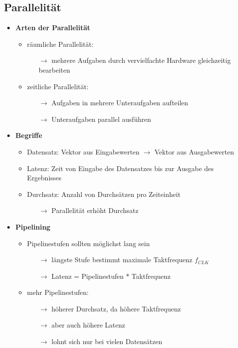 \documentclass[11pt,a4paper]{article}
\begin{document}
\subsection{Parallelität}
\begin{itemize}

\item \textbf{Arten der Parallelität}
	\begin{itemize}
	\item räumliche Parallelität:
		\begin{itemize}
		\item[$\rightarrow$] mehrere Aufgaben durch vervielfachte Hardware gleichzeitig bearbeiten
		\end{itemize}
	
	\item zeitliche Parallelität:
		\begin{itemize}
		\item[$\rightarrow$] Aufgaben in mehrere Unteraufgaben aufteilen
		\item[$\rightarrow$] Unteraufgaben parallel ausführen
		\end{itemize}
	
	\end{itemize}
	
\item \textbf{Begriffe}
	\begin{itemize}
	\item Datensatz: Vektor aus Eingabewerten $\rightarrow$ Vektor aus Ausgabewerten
	\item Latenz: Zeit von Eingabe des Datensatzes bis zur Ausgabe des Ergebnisses
	\item Durchsatz: Anzahl von Durchsätzen pro Zeiteinheit
		\begin{itemize}
		\item[$\rightarrow$] Parallelität erhöht Durchsatz
		\end{itemize}
	
	\end{itemize}
	
\item \textbf{Pipelining}
	\begin{itemize}
	\item Pipelinestufen sollten möglichst lang sein
		\begin{itemize}
		\item[$\rightarrow$] längste Stufe bestimmt maximale Taktfrequenz $f_{CLK}$
		\item[$\rightarrow$] Latenz = Pipelinestufen * Taktfrequenz
		\end{itemize}			
	\item mehr Pipelinestufen:
		\begin{itemize}
		\item[$\rightarrow$] höherer Durchsatz, da höhere Taktfrequenz
		\item[$\rightarrow$] aber auch höhere Latenz
		\item[$\rightarrow$] lohnt sich nur bei vielen Datensätzen
		\end{itemize}
		
	\end{itemize}

\end{itemize}
\end{document}
